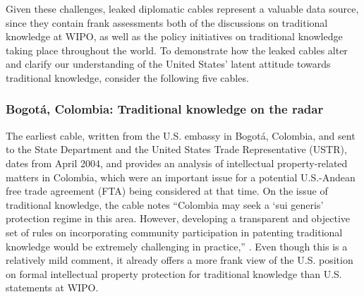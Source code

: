 \documentclass[12pt]{article}
\begin{document}
Given these challenges, leaked diplomatic cables represent a valuable 
data source, since they contain frank assessments both of the discussions on traditional 
knowledge at WIPO, as well as the policy initiatives on traditional knowledge taking place 
throughout the world. To demonstrate how the leaked cables alter and clarify our  
understanding of the United States' 
latent attitude towards traditional knowledge, consider the following five cables.

\subsubsection{Bogot\'a, Colombia: Traditional knowledge on the radar}
The earliest 
cable, written from the U.S. embassy in Bogot\'a, Colombia, and sent to the State Department and the 
United States Trade Representative (USTR), dates from April 2004, and provides an analysis of intellectual 
property-related matters in Colombia, which were an important issue for a potential U.S.-Andean 
free trade agreement (FTA) being considered at that time. 
On the issue of traditional knowledge, the cable 
notes ``Colombia may seek a `sui generis' protection regime in this area. However, developing a 
transparent and objective set of rules on incorporating community participation in patenting 
traditional knowledge would be extremely challenging in 
practice,'' \citep{u.s._department_of_state2004andean}. Even though this 
is a relatively mild comment, it already offers a more frank view of the U.S. position on formal 
intellectual property protection for traditional knowledge than U.S. statements at WIPO.
\end{document}
